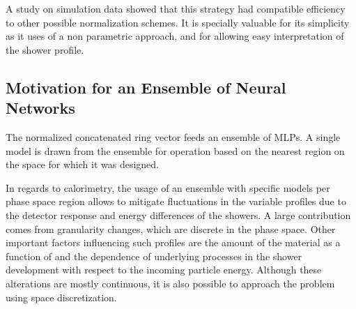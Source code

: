 A study on simulation data showed that this strategy had compatible
efficiency to other possible normalization schemes. It is specially valuable for its
simplicity as it uses of a non parametric approach, and for allowing easy interpretation of the shower profile. 


\subsection{Motivation for an Ensemble of Neural Networks}\label{top:nn_ensemble}

The normalized concatenated ring vector feeds an ensemble of MLPs. A single
model is drawn from the ensemble for operation based on the nearest region on the \eteta space for which it was designed.

In regards to calorimetry, the usage of an ensemble with specific models per
phase space region allows to mitigate fluctuations in the variable profiles
due to the detector response and energy differences of the showers.
A large contribution comes from granularity changes, which are discrete
in the phase space. Other important factors 
influencing such profiles are the
amount of the material as a function of \abseta{} and the dependence of
underlying processes in the shower development with respect to the incoming
particle energy. Although these alterations are mostly continuous, it is also
possible to approach the problem using space discretization.


